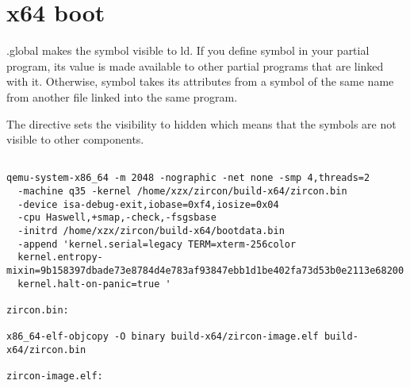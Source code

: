 \section{x64 boot}

.global makes the symbol visible to ld. If you define symbol in your partial
program, its value is made available to other partial programs that are linked
with it. Otherwise, symbol takes its attributes from a symbol of the same name
from another file linked into the same program. 

 The directive sets the visibility to hidden which means that the symbols are
 not visible to other components.

 \begin{verbatim}

qemu-system-x86_64 -m 2048 -nographic -net none -smp 4,threads=2 
  -machine q35 -kernel /home/xzx/zircon/build-x64/zircon.bin 
  -device isa-debug-exit,iobase=0xf4,iosize=0x04 
  -cpu Haswell,+smap,-check,-fsgsbase 
  -initrd /home/xzx/zircon/build-x64/bootdata.bin 
  -append 'kernel.serial=legacy TERM=xterm-256color 
  kernel.entropy-mixin=9b158397dbade73e8784d4e783af93847ebb1d1be402fa73d53b0e2113e68200 
  kernel.halt-on-panic=true '

zircon.bin:

x86_64-elf-objcopy -O binary build-x64/zircon-image.elf build-x64/zircon.bin

zircon-image.elf:

 \end{verbatim}